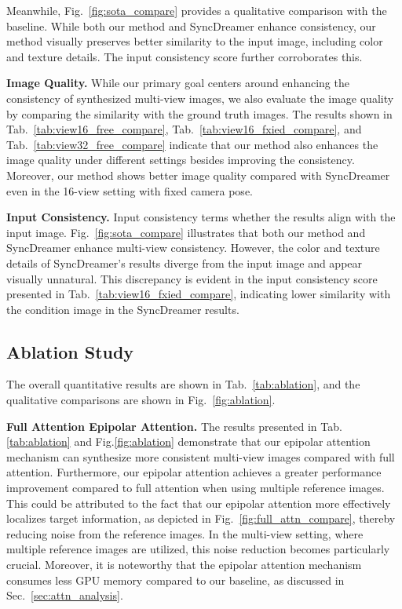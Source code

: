 Meanwhile, Fig.~\ref{fig:sota_compare} provides a qualitative comparison with the baseline. While both our method and SyncDreamer enhance consistency, our method visually preserves better similarity to the input image, including color and texture details. The input consistency score further corroborates this.

\noindent\textbf{Image Quality.}
While our primary goal centers around enhancing the consistency of synthesized multi-view images, we also evaluate the image quality by comparing the similarity with the ground truth images. The results shown in Tab.~\ref{tab:view16_free_compare}, Tab.~\ref{tab:view16_fxied_compare}, and Tab.~\ref{tab:view32_free_compare} indicate that our method also enhances the image quality under different settings besides improving the consistency.
Moreover, our method shows better image quality compared with SyncDreamer even in the 16-view setting with fixed camera pose.

\noindent\textbf{Input Consistency.}
Input consistency terms whether the results align with the input image.
Fig.~\ref{fig:sota_compare} illustrates that both our method and SyncDreamer enhance multi-view consistency. However, the color and texture details of SyncDreamer's results diverge from the input image and appear visually unnatural.
This discrepancy is evident in the input consistency score presented in Tab.~\ref{tab:view16_fxied_compare}, indicating lower similarity with the condition image in the SyncDreamer results.	

\subsection{Ablation Study}
The overall quantitative results are shown in Tab.~\ref{tab:ablation}, and the qualitative comparisons are shown in Fig.~\ref{fig:ablation}.

\noindent \textbf{Full Attention \vs Epipolar Attention.}
The results presented in Tab.\ref{tab:ablation} and Fig.\ref{fig:ablation} demonstrate that our epipolar attention mechanism can synthesize more consistent multi-view images compared with full attention. Furthermore, our epipolar attention achieves a greater performance improvement compared to full attention when using multiple reference images. This could be attributed to the fact that our epipolar attention more effectively localizes target information, as depicted in Fig.~\ref{fig:full_attn_compare}, thereby reducing noise from the reference images. In the multi-view setting, where multiple reference images are utilized, this noise reduction becomes particularly crucial.
Moreover, it is noteworthy that the epipolar attention mechanism consumes less GPU memory compared to our baseline, as discussed in Sec.~\ref{sec:attn_analysis}.

